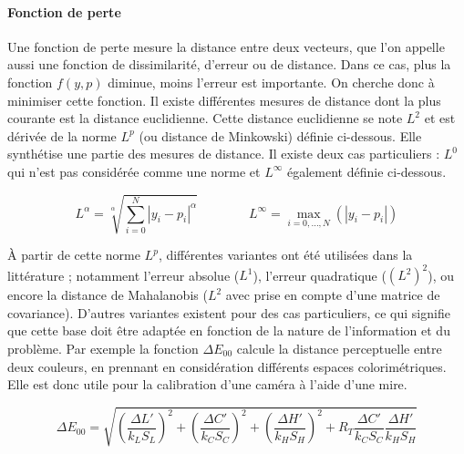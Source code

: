\documentclass[../thesis.tex]{subfiles}
\begin{document}
    \paragraph{Fonction de perte} Une fonction de perte mesure la distance entre deux vecteurs, que l'on appelle aussi une fonction de dissimilarité, d'erreur ou de distance. Dans ce cas, plus la fonction $f(y,p)$ diminue, moins l'erreur est importante. On cherche donc à minimiser cette fonction. Il existe différentes mesures de distance dont la plus courante est la distance euclidienne. %
    Cette distance euclidienne se note $L^2$ et est dérivée de la norme $L^p$ (ou distance de Minkowski) définie ci-dessous. Elle synthétise une partie des mesures de distance. Il existe deux cas particuliers : $L^0$ qui n'est pas considérée comme une norme et $L^\infty$ également définie ci-dessous.
    
    \vfill
    \begin{equation}
    L^\alpha = \sqrt[\alpha]{\sum_{i=0}^{N}{|y_i-p_i|^\alpha}}
    \hspace{4em}
    L^\infty = \max\limits_{i=0,\dots,N}(|y_i - p_i|)
    \end{equation}
    \vfill
    
    À partir de cette norme $L^p$, différentes variantes ont été utilisées dans la littérature ; notamment l'erreur absolue ($L^1$), l'erreur quadratique ($(L^2)^2$), ou encore la distance de Mahalanobis ($L^2$ avec prise en compte d'une matrice de covariance). D'autres variantes existent pour des cas particuliers, ce qui signifie que cette base doit être adaptée en fonction de la nature de l'infor\-mation et du problème. Par exemple la fonction $\Delta E_{00}$ calcule la distance perceptuelle entre deux couleurs, en prennant en considération différents espaces colorimétriques. Elle est donc utile pour la calibration d'une caméra à l'aide d'une mire.
    
    \vfill
    \begin{equation}
    \Delta E_{00} = \sqrt{(\frac{\Delta L'}{k_L S_L})^2 + (\frac{\Delta C'}{k_C S_C})^2 + (\frac{\Delta H'}{k_H S_H})^2 + R_T \frac{\Delta C'}{k_C S_C} \frac{\Delta H'}{k_H S_H} }
    \end{equation}
    \vfill
    
\end{document}
